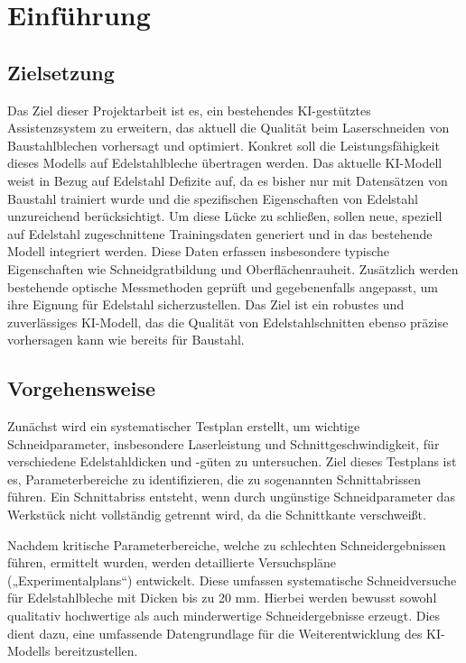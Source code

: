 \chapter{Einführung}
\section{Zielsetzung}
Das Ziel dieser Projektarbeit ist es, ein bestehendes KI-gestütztes Assistenzsystem zu erweitern, das aktuell die Qualität beim Laserschneiden von Baustahlblechen vorhersagt und optimiert. Konkret soll die Leistungsfähigkeit dieses Modells auf Edelstahlbleche übertragen werden. Das aktuelle KI-Modell weist in Bezug auf Edelstahl Defizite auf, da es bisher nur mit Datensätzen von Baustahl trainiert wurde und die spezifischen Eigenschaften von Edelstahl unzureichend berücksichtigt.
Um diese Lücke zu schließen, sollen neue, speziell auf Edelstahl zugeschnittene Trainingsdaten generiert und in das bestehende Modell integriert werden. Diese Daten erfassen insbesondere typische Eigenschaften wie Schneidgratbildung und Oberflächenrauheit. Zusätzlich werden bestehende optische Messmethoden geprüft und gegebenenfalls angepasst, um ihre Eignung für Edelstahl sicherzustellen. Das Ziel ist ein robustes und zuverlässiges KI-Modell, das die Qualität von Edelstahlschnitten ebenso präzise vorhersagen kann wie bereits für Baustahl.

\section{Vorgehensweise}
Zunächst wird ein systematischer Testplan erstellt, um wichtige Schneidparameter, insbesondere Laserleistung und Schnittgeschwindigkeit, für verschiedene Edelstahldicken und -güten zu untersuchen. Ziel dieses Testplans ist es, Parameterbereiche zu identifizieren, die zu sogenannten Schnittabrissen führen. Ein Schnittabriss entsteht, wenn durch ungünstige Schneidparameter das Werkstück nicht vollständig getrennt wird, da die Schnittkante verschweißt.

Nachdem kritische Parameterbereiche, welche zu schlechten Schneidergebnissen führen, ermittelt wurden, werden detaillierte Versuchspläne („Experimentalplans“) entwickelt. Diese umfassen systematische Schneidversuche für Edelstahlbleche mit Dicken bis zu 20 mm. Hierbei werden bewusst sowohl qualitativ hochwertige als auch minderwertige Schneidergebnisse erzeugt. Dies dient dazu, eine umfassende Datengrundlage für die Weiterentwicklung des KI-Modells bereitzustellen.

